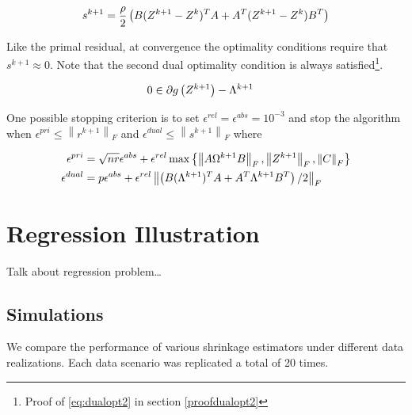 \documentclass[11pt,]{report}
\begin{document}
\begin{equation}
s^{k + 1} = \frac{\rho}{2}\left( B(Z^{k + 1} - Z^{k})^{T}A + A^{T}(Z^{k + 1} - Z^{k})B^{T} \right)
\label{eq:stopproof}\notag
\end{equation}

Like the primal residual, at convergence the optimality conditions require that \(s^{k + 1} \approx 0\). Note that the second dual optimality condition is always satisfied\footnote{Proof of \eqref{eq:dualopt2} in section \ref{proofdualopt2}}.

\begin{equation}
\begin{split}
  0 &\in \partial g\left(Z^{k + 1}\right) - \Lambda^{k + 1}
\label{eq:dualopt2}\notag
\end{split}
\end{equation}

One possible stopping criterion is to set \(\epsilon^{rel} = \epsilon^{abs} = 10^{-3}\) and stop the algorithm when \(\epsilon^{pri} \leq \left\| r^{k + 1} \right\|_{F}\) and \(\epsilon^{dual} \leq \left\| s^{k + 1} \right\|_{F}\) where

\begin{equation}
\begin{split}
  \epsilon^{pri} &= \sqrt{nr}\epsilon^{abs} + \epsilon^{rel}\max\left\{ \left\| A\Omega^{k + 1}B \right\|_{F}, \left\| Z^{k + 1} \right\|_{F}, \left\| C \right\|_{F} \right\} \\
  \epsilon^{dual} &= p\epsilon^{abs} + \epsilon^{rel}\left\| \left( B(\Lambda^{k + 1})^{T}A + A^{T}\Lambda^{k + 1}B^{T} \right)/2 \right\|_{F}
\label{eq:scpmestopping}\notag
\end{split}
\end{equation}

\hypertarget{regression-illustration}{%
\chapter{Regression Illustration}\label{regression-illustration}}

Talk about regression problem\ldots{}

\hypertarget{simulations-1}{%
\section{Simulations}\label{simulations-1}}

We compare the performance of various shrinkage estimators under different data realizations. Each data scenario was replicated a total of 20 times.
\end{document}
